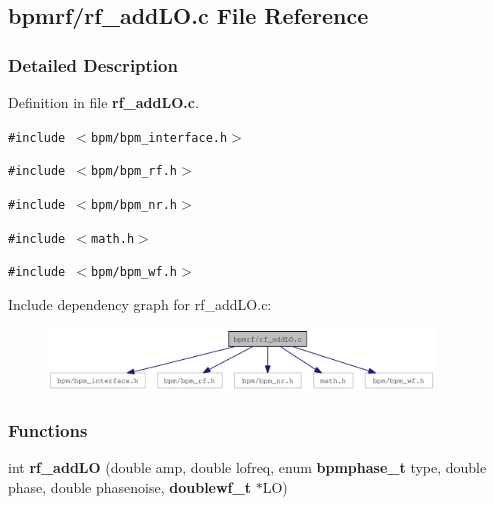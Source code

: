 \subsection{bpmrf/rf\_\-addLO.c File Reference}
\label{rf__addLO_8c}


\subsubsection{Detailed Description}


Definition in file {\bf rf\_\-addLO.c}.

{\tt \#include $<$bpm/bpm\_\-interface.h$>$}\par
{\tt \#include $<$bpm/bpm\_\-rf.h$>$}\par
{\tt \#include $<$bpm/bpm\_\-nr.h$>$}\par
{\tt \#include $<$math.h$>$}\par
{\tt \#include $<$bpm/bpm\_\-wf.h$>$}\par


Include dependency graph for rf\_\-addLO.c:\nopagebreak
\begin{figure}[H]
\begin{center}
\leavevmode
\includegraphics[width=290pt]{rf__addLO_8c__incl}
\end{center}
\end{figure}
\subsubsection*{Functions}
\begin{CompactItemize}
\item 
int {\bf rf\_\-addLO} (double amp, double lofreq, enum {\bf bpmphase\_\-t} type, double phase, double phasenoise, {\bf doublewf\_\-t} $\ast$LO)
\end{CompactItemize}
